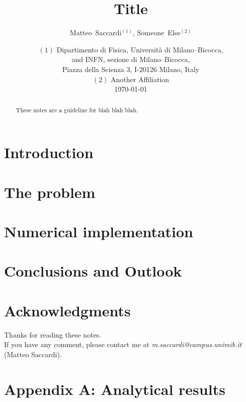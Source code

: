 \documentclass[11pt]{article}
\author{Matteo~Saccardi$^{(1)}$, Someone~Else$^{(2)}$}
\date{%
    $(1)$ Dipartimento di Fisica, Universit\`a di Milano--Bicocca,\\
and INFN, sezione di Milano--Bicocca,\\
Piazza della Scienza 3, I-20126 Milano, Italy\\
    $(2)$ Another Affiliation\\
    \today
}
\title{\Large\bf Title\\[0.5ex]}
\begin{document}
\maketitle

\begin{abstract}
    These notes are a guideline for blah blah blah.\\[0.5ex]
\end{abstract}

\tableofcontents

\section{Introduction\label{sec:intro}}


\section{The problem}\label{sec:1}


\section{Numerical implementation}\label{sec:2}


\section{Conclusions and Outlook}\label{sec:concl}


\section{Acknowledgments}
Thanks for reading these notes.\\
If you have any comment, please contact me at \textit{m.saccardi@campus.unimib.it} (Matteo Saccardi).

\appendix

\section{Appendix A: Analytical results\label{app:A}}




\end{document}
